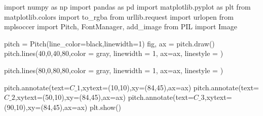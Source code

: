 \documentclass[
  us-letterpaper,
  DIV=11,
  numbers=noendperiod]{scrreprt}
\newenvironment{Shaded}{\begin{snugshade}}{\end{snugshade}}
\newcommand{\DecValTok}[1]{\textcolor[rgb]{0.68,0.00,0.00}{#1}}
\newcommand{\ImportTok}[1]{\textcolor[rgb]{0.00,0.46,0.62}{#1}}
\newcommand{\NormalTok}[1]{\textcolor[rgb]{0.00,0.23,0.31}{#1}}
\newcommand{\OperatorTok}[1]{\textcolor[rgb]{0.37,0.37,0.37}{#1}}
\newcommand{\StringTok}[1]{\textcolor[rgb]{0.13,0.47,0.30}{#1}}
\begin{document}
\begin{Shaded}
\begin{Highlighting}[]
\ImportTok{import}\NormalTok{ numpy }\ImportTok{as}\NormalTok{ np }
\ImportTok{import}\NormalTok{ pandas }\ImportTok{as}\NormalTok{ pd}
\ImportTok{import}\NormalTok{ matplotlib.pyplot }\ImportTok{as}\NormalTok{ plt }
\ImportTok{from}\NormalTok{ matplotlib.colors }\ImportTok{import}\NormalTok{ to\_rgba}
\ImportTok{from}\NormalTok{ urllib.request }\ImportTok{import}\NormalTok{ urlopen}
\ImportTok{from}\NormalTok{ mplsoccer }\ImportTok{import}\NormalTok{ Pitch, FontManager, add\_image}
\ImportTok{from}\NormalTok{ PIL }\ImportTok{import}\NormalTok{ Image}

\NormalTok{pitch }\OperatorTok{=}\NormalTok{ Pitch(line\_color}\OperatorTok{=}\StringTok{\textquotesingle{}black\textquotesingle{}}\NormalTok{,linewidth}\OperatorTok{=}\DecValTok{1}\NormalTok{)}
\NormalTok{fig, ax }\OperatorTok{=}\NormalTok{ pitch.draw()}
\NormalTok{pitch.lines(}\DecValTok{40}\NormalTok{,}\DecValTok{0}\NormalTok{,}\DecValTok{40}\NormalTok{,}\DecValTok{80}\NormalTok{,color }\OperatorTok{=} \StringTok{\textquotesingle{}gray\textquotesingle{}}\NormalTok{, linewidth }\OperatorTok{=} \DecValTok{1}\NormalTok{, ax}\OperatorTok{=}\NormalTok{ax, linestyle }\OperatorTok{=} \StringTok{\textquotesingle{}{-}{-}\textquotesingle{}}\NormalTok{)}

\NormalTok{pitch.lines(}\DecValTok{80}\NormalTok{,}\DecValTok{0}\NormalTok{,}\DecValTok{80}\NormalTok{,}\DecValTok{80}\NormalTok{,color }\OperatorTok{=} \StringTok{\textquotesingle{}gray\textquotesingle{}}\NormalTok{, linewidth }\OperatorTok{=} \DecValTok{1}\NormalTok{, ax}\OperatorTok{=}\NormalTok{ax, linestyle }\OperatorTok{=} \StringTok{\textquotesingle{}{-}{-}\textquotesingle{}}\NormalTok{)}

\NormalTok{pitch.annotate(text}\OperatorTok{=}\StringTok{\textquotesingle{}$C\_1$\textquotesingle{}}\NormalTok{,xytext}\OperatorTok{=}\NormalTok{(}\DecValTok{10}\NormalTok{,}\DecValTok{10}\NormalTok{),xy}\OperatorTok{=}\NormalTok{(}\DecValTok{84}\NormalTok{,}\DecValTok{45}\NormalTok{),ax}\OperatorTok{=}\NormalTok{ax)}
\NormalTok{pitch.annotate(text}\OperatorTok{=}\StringTok{\textquotesingle{}$C\_2$\textquotesingle{}}\NormalTok{,xytext}\OperatorTok{=}\NormalTok{(}\DecValTok{50}\NormalTok{,}\DecValTok{10}\NormalTok{),xy}\OperatorTok{=}\NormalTok{(}\DecValTok{84}\NormalTok{,}\DecValTok{45}\NormalTok{),ax}\OperatorTok{=}\NormalTok{ax)}
\NormalTok{pitch.annotate(text}\OperatorTok{=}\StringTok{\textquotesingle{}$C\_3$\textquotesingle{}}\NormalTok{,xytext}\OperatorTok{=}\NormalTok{(}\DecValTok{90}\NormalTok{,}\DecValTok{10}\NormalTok{),xy}\OperatorTok{=}\NormalTok{(}\DecValTok{84}\NormalTok{,}\DecValTok{45}\NormalTok{),ax}\OperatorTok{=}\NormalTok{ax)}
\NormalTok{plt.show()}
\end{Highlighting}
\end{Shaded}
\end{document}
